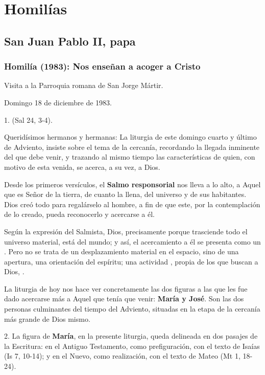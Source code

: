 \section{Homilías}

\subsection{San Juan Pablo II, papa}

\subsubsection{Homilía (1983): Nos enseñan a acoger a Cristo}

Visita a la Parroquia romana de San Jorge Mártir.

Domingo 18 de diciembre de 1983.

1.  (Sal 24, 3-4).

Queridísimos hermanos y hermanas: La liturgia de este domingo cuarto y último de Adviento, insiste sobre el tema de la cercanía, recordando la llegada inminente del que debe venir, y trazando al mismo tiempo las características de quien, con motivo de esta venida, se acerca, a su vez, a Dios.

Desde los primeros versículos, el \textbf{Salmo responsorial} nos lleva a lo alto, a Aquel que es Señor de la tierra, de cuanto la llena, del universo y de sus habitantes. Dios creó todo para regalárselo al hombre, a fin de que este, por la contemplación de lo creado, pueda reconocerlo y acercarse a él.

Según la expresión del Salmista, Dios, precisamente porque trasciende todo el universo material, está  del mundo; y así, el acercamiento a él se presenta como un . Pero no se trata de un desplazamiento material en el espacio, sino de una apertura, una orientación del espíritu; una actividad , propia de los que buscan a Dios, .

La liturgia de hoy nos hace ver concretamente las dos figuras a las que les fue dado acercarse más a Aquel que tenía que venir: \textbf{María y José}. Son las dos personas culminantes del tiempo del Adviento, situadas en la etapa de la cercanía más grande de Dios mismo.

2. La figura de \textbf{María}, en la presente liturgia, queda delineada en dos pasajes de la Escritura: en el Antiguo Testamento, como prefiguración, con el texto de Isaías (Is 7, 10-14); y en el Nuevo, como realización, con el texto de Mateo (Mt 1, 18-24).

